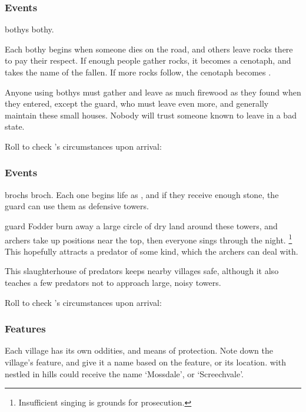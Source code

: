 \begin{multicols}{2}

\subsubsection{ Events}

\Glspl{bothy} \glsdesc{bothy}.

Each \gls{bothy} begins when someone dies on the road, and others leave rocks there to pay their respect.
If enough people gather rocks, it becomes a cenotaph, and takes the name of the fallen.
If more rocks follow, the cenotaph becomes .

Anyone using \glspl{bothy} must gather and leave as much firewood as they found when they entered, except the \gls{guard}, who must leave even more, and generally maintain these small houses.
Nobody will trust someone known to leave  in a bad state.

Roll to check 's circumstances upon arrival:

\bothyEvents

\subsubsection{ Events}

\Glspl{broch} \glsdesc{broch}.
Each one begins life as , and if they receive enough stone, the \gls{guard} can use them as defensive towers.

\Gls{guard} Fodder burn away a large circle of dry land around these towers, and archers take up positions near the top, then everyone sings through the night.%
\footnote{Insufficient singing is grounds for prosecution.}
This hopefully attracts a predator of some kind, which the archers can deal with.

This slaughterhouse of predators keeps nearby \glspl{village} safe, although it also teaches a few predators not to approach large, noisy towers.

Roll to check 's circumstances upon arrival:

\brochEvents

\subsubsection{ Features}
\label{villageFeatures}

Each \gls{village} has its own oddities, and means of protection.
Note down the \gls{village}'s feature, and give it a name based on the feature, or its location.
 with  nestled in hills could receive the name `Mossdale', or `Screechvale'.


\end{multicols}
